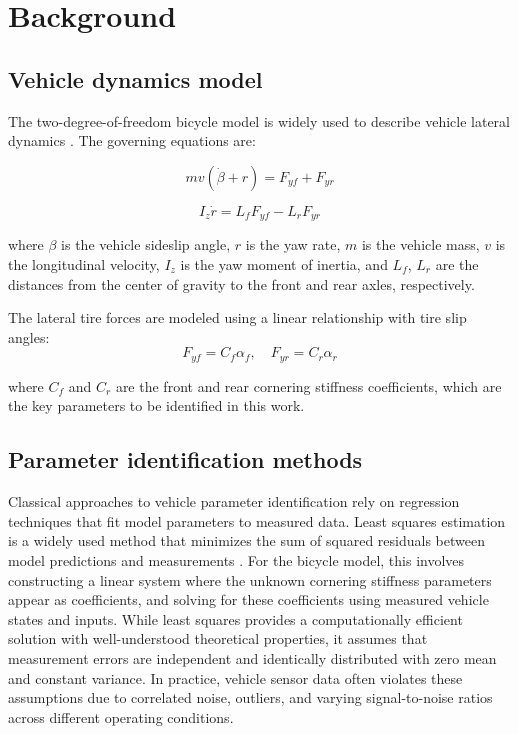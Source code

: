 \documentclass[Afour,sageh,times]{sagej}
\begin{document}
\section{Background}
\label{sec:background}

\subsection{Vehicle dynamics model}
\label{sec:vehicle_model}

The two-degree-of-freedom bicycle model is widely used to describe vehicle lateral dynamics \citep{rajamani2012vehicle}. The governing equations are:

\begin{equation}
m v (\dot{\beta} + r) = F_{yf} + F_{yr}
\end{equation}

\begin{equation}
I_z \dot{r} = L_f F_{yf} - L_r F_{yr}
\end{equation}

where $\beta$ is the vehicle sideslip angle, $r$ is the yaw rate, $m$ is the vehicle mass, $v$ is the longitudinal velocity, $I_z$ is the yaw moment of inertia, and $L_f$, $L_r$ are the distances from the center of gravity to the front and rear axles, respectively.

The lateral tire forces are modeled using a linear relationship with tire slip angles:
\begin{equation}
F_{yf} = C_f \alpha_f, \quad F_{yr} = C_r \alpha_r
\end{equation}

where $C_f$ and $C_r$ are the front and rear cornering stiffness coefficients, which are the key parameters to be identified in this work.

\subsection{Parameter identification methods}
\label{sec:param_id_methods}

Classical approaches to vehicle parameter identification rely on regression techniques that fit model parameters to measured data. Least squares estimation is a widely used method that minimizes the sum of squared residuals between model predictions and measurements \citep{rajamani2012vehicle}. For the bicycle model, this involves constructing a linear system where the unknown cornering stiffness parameters appear as coefficients, and solving for these coefficients using measured vehicle states and inputs. While least squares provides a computationally efficient solution with well-understood theoretical properties, it assumes that measurement errors are independent and identically distributed with zero mean and constant variance. In practice, vehicle sensor data often violates these assumptions due to correlated noise, outliers, and varying signal-to-noise ratios across different operating conditions.
\end{document}
